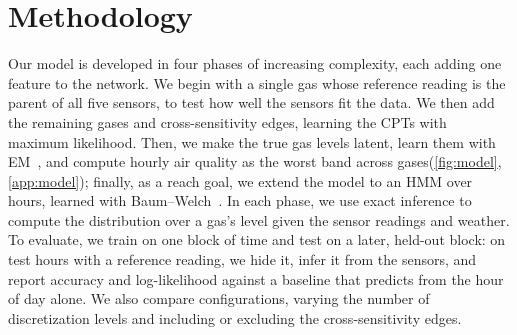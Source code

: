 \section{Methodology}
\label{sec:methodology}

Our model is developed in four phases of increasing complexity, each adding
one feature to the network. We begin with a single gas whose reference
reading is the parent of all five sensors, to test how well the sensors fit
the data. We then add the remaining gases and cross-sensitivity edges,
learning the CPTs with maximum likelihood. Then, we make the true gas levels
latent, learn them with EM~\citep{dempster1977em}, and compute hourly air
quality as the worst band across gases(\cref{fig:model},
\cref{app:model}); finally, as a reach goal, we extend
the model to an HMM over hours, learned with Baum--Welch~\citep{rabiner1989hmm}.
In each phase, we use exact inference to compute the distribution over a gas's
level given the sensor readings and weather. To evaluate, we train on one block
of time and test on a later, held-out block: on test hours with a reference
reading, we hide it, infer it from the sensors, and report accuracy and
log-likelihood against a baseline that predicts from the hour of day alone.
We also compare configurations, varying the number of discretization levels
and including or excluding the cross-sensitivity edges.
